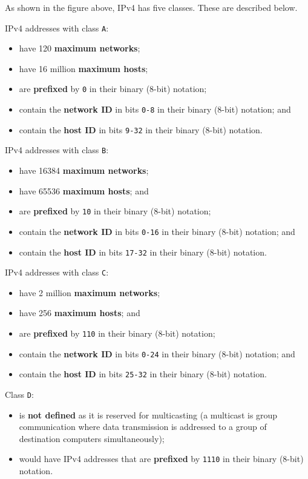 \documentclass[a4paper]{systems-software}
\begin{document}
As shown in the figure above, IPv4 has five classes. These are described below.

\newpage

IPv4 addresses with class \texttt{A}:
\begin{itemize}
	\item have 120 \textbf{maximum networks};
	\item have 16 million \textbf{maximum hosts};
	\item are \textbf{prefixed} by \texttt{0} in their binary (8-bit) notation;
	\item contain the \textbf{network ID} in bits \texttt{0-8} in their binary (8-bit) notation; and
	\item contain the \textbf{host ID} in bits \texttt{9-32} in their binary (8-bit) notation.
\end{itemize}

IPv4 addresses with class \texttt{B}:
\begin{itemize}
	\item have 16384 \textbf{maximum networks};
	\item have 65536 \textbf{maximum hosts}; and
	\item are \textbf{prefixed} by \texttt{10} in their binary (8-bit) notation;
	\item contain the \textbf{network ID} in bits \texttt{0-16} in their binary (8-bit) notation; and
	\item contain the \textbf{host ID} in bits \texttt{17-32} in their binary (8-bit) notation.
\end{itemize}

IPv4 addresses with class \texttt{C}:
\begin{itemize}
	\item have 2 million \textbf{maximum networks};
	\item have 256 \textbf{maximum hosts}; and
	\item are \textbf{prefixed} by \texttt{110} in their binary (8-bit) notation;
	\item contain the \textbf{network ID} in bits \texttt{0-24} in their binary (8-bit) notation; and
	\item contain the \textbf{host ID} in bits \texttt{25-32} in their binary (8-bit) notation.
\end{itemize}

Class \texttt{D}:
\begin{itemize}
	\item is \textbf{not defined} as it is reserved for multicasting (a multicast is group communication where data transmission is addressed to a group of destination computers simultaneously);
	\item would have IPv4 addresses that are \textbf{prefixed} by \texttt{1110} in their binary (8-bit) notation.
\end{itemize}
\end{document}
